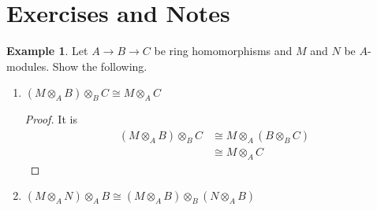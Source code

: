 \documentclass[a4paper]{book}
\theoremstyle{definition}
\newtheorem{example}{Example}[definition]
\begin{document}
\newpage
\section{Exercises and Notes}

\begin{example}
    Let \(A \rightarrow B \rightarrow C\) be ring homomorphisms and \(M\) and \(N\) be \(A\)-modules. Show the following.
    \begin{enumerate}
        \item \((M \otimes_A B) \otimes_B C \cong M \otimes_A C\)
        
        \begin{proof}
            It is
            \begin{align*}
                (M \otimes_A B) \otimes_B C & \cong M \otimes_A (B \otimes_B C) \\
                & \cong M \otimes_A C
            \end{align*}
        \end{proof}

        \item \((M \otimes_A N) \otimes_A B \cong (M \otimes_A B) \otimes_B (N \otimes_A B)\)
    \end{enumerate}
\end{example}
\end{document}
